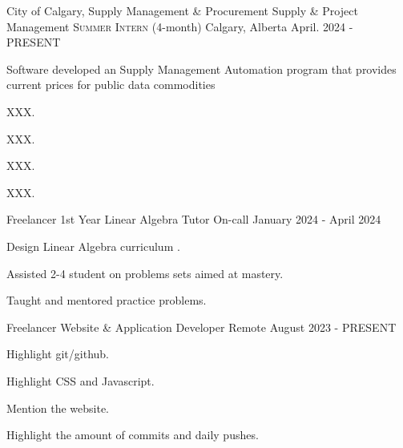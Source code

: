 


\begin{cventries}
  \cventry
    {City of Calgary, Supply Management \& Procurement} %
    {Supply \& Project Management  \textsc{Summer Intern} (4-month)} %
    {Calgary, Alberta } %
    {April. 2024 - PRESENT} %
    {
      \begin{cvitems} %
        \item Software developed an Supply Management Automation program that provides current prices for public data commodities
        \item XXX.
        \item XXX.
        \item XXX.
        \item XXX.
      \end{cvitems}
    }

  \cventry
    {Freelancer} %
    {1st Year Linear Algebra Tutor} %
    {On-call} %
    {January 2024  - April 2024} %
    {
      \begin{cvitems} %
        \item Design Linear Algebra curriculum .
        \item Assisted 2-4 student on problems sets aimed at mastery.
        \item Taught and mentored practice problems.
      \end{cvitems}
    }


  \cventry
    {Freelancer} %
    {Website \& Application Developer} %
    {Remote} %
    {August 2023 - PRESENT} %
    {
      \begin{cvitems} %
        \item Highlight git/github.
        \item Highlight CSS and Javascript.
        \item Mention the website.
        \item Highlight the amount of commits and daily pushes.
      \end{cvitems}
    }




\end{cventries}
